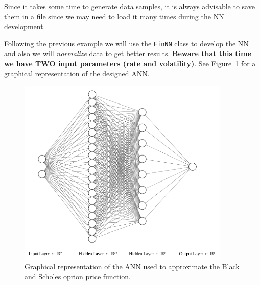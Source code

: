 Since it takes some time to generate data samples, it is always advisable to save them in a file since we may need to load it many times during the NN development. 

Following the previous example we will use the \texttt{FinNN} class to develop the NN and also we will \emph{normalize} data to get better results. \textbf{Beware that this time we have TWO input parameters (rate and volatility)}. See Figure~\ref{fig:ann_2} for a graphical representation of the designed ANN.

\begin{figure}[htb]
\centering
\includegraphics[width=0.9\textwidth]{figures/ann_2.png}
\caption{Graphical representation of the ANN used to approximate the Black and Scholes oprion price function.}
\label{fig:ann_2}
\end{figure}

